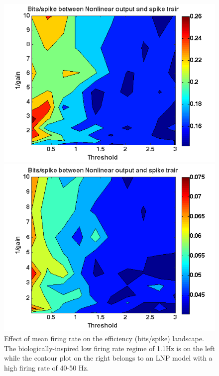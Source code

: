 \documentclass[12pt]{article}
\begin{document}
\begin{figure}[h!!]
\centering
\begin{minipage}[b]{0.48\linewidth}
\centering
\includegraphics[scale=0.4]{4f_contour_LNPsimulation_OFFcell.png}
\end{minipage}
\begin{minipage}[b]{0.48\linewidth}
\centering
\includegraphics[scale=0.38]{4f_contour_LNPsimulation_ONcell_highFiringRate.png}
\end{minipage}
\caption{Effect of mean firing rate on the efficiency (bits/spike) landscape. The biologically-inspired low firing rate regime of 1.1Hz is on the left while the contour plot on the right belongs to an LNP model with a high firing rate of 40-50 Hz.}
\label{Figure 8}
\end{figure}
\end{document}
